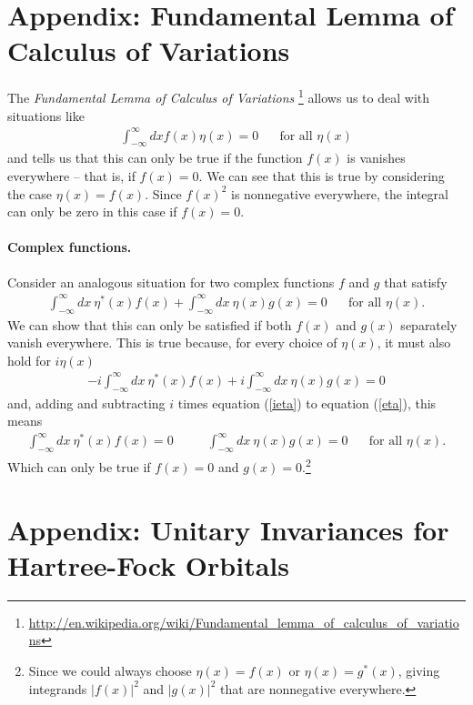 \documentclass[11pt]{article}
\renewcommand{\sp}{\ensuremath{\ \ \ \ \ \ }}
\theoremstyle{indented}
\begin{document}
\newpage
\section{Appendix: Fundamental Lemma of Calculus of Variations}
\label{flcv}
The {\it Fundamental Lemma of Calculus of Variations} \footnote{\url{http://en.wikipedia.org/wiki/Fundamental_lemma_of_calculus_of_variations}} allows us to deal with situations like
\begin{align}
	\int_{-\infty}^\infty dx f(x)\eta(x)
=
	0
\sp\text{ for all $\eta(x)$}
\end{align}
and tells us that this can only be true if the function $f(x)$ is vanishes everywhere -- that is, if $f(x)=0$.
We can see that this is true by considering the case $\eta(x)=f(x)$.
Since $f(x)^2$ is nonnegative everywhere, the integral can only be zero in this case if $f(x)=0$.

\paragraph{Complex functions.}
Consider an analogous situation for two complex functions $f$ and $g$ that satisfy
\begin{align}
\label{eta}
\int_{-\infty}^\infty dx\
	\eta^*(x)f(x)
+\int_{-\infty}^\infty dx\
	\eta(x)g(x)
=
	0
\sp\text{ for all $\eta(x)$.}
\end{align}
We can show that this can only be satisfied if both $f(x)$ and $g(x)$ separately vanish everywhere.
This is true because, for every choice of $\eta(x)$, it must also hold for $i\eta(x)$
\begin{align}
\label{ieta}
-i\int_{-\infty}^\infty dx\
	\eta^*(x)f(x)
+i\int_{-\infty}^\infty dx\
	\eta(x)g(x)
=
	0
\end{align}
and, adding and subtracting $i$ times equation (\ref{ieta}) to equation (\ref{eta}), this means
\begin{align}
	\int_{-\infty}^\infty dx\ \eta^*(x)f(x)=0
\sp\sp
	\int_{-\infty}^\infty dx\ \eta(x)g(x)=0
\sp\text{ for all $\eta(x)$.}
\end{align}
Which can only be true if $f(x)=0$ and $g(x)=0$.\footnote{Since we could always choose $\eta(x)=f(x)$ or $\eta(x)=g^*(x)$, giving integrands $|f(x)|^2$ and $|g(x)|^2$ that are nonnegative everywhere.}


\newpage
\section{Appendix: Unitary Invariances for Hartree-Fock Orbitals}
\label{hf-invariance}
\end{document}
